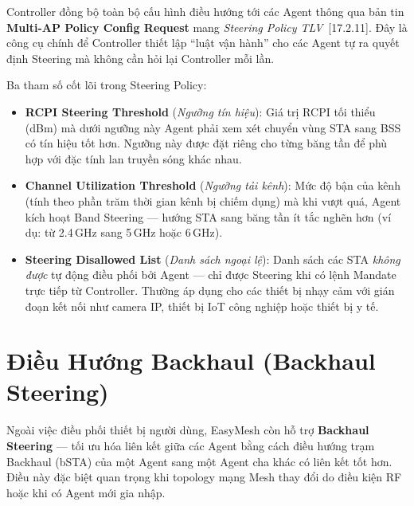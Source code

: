 Controller đồng bộ toàn bộ cấu hình điều hướng tới các Agent thông qua bản tin
\textbf{Multi-AP Policy Config Request} mang \textit{Steering Policy TLV}~[17.2.11].
Đây là công cụ chính để Controller thiết lập ``luật vận hành'' cho các Agent tự ra
quyết định Steering mà không cần hỏi lại Controller mỗi lần.

Ba tham số cốt lõi trong Steering Policy:
\begin{itemize}
	\item \textbf{RCPI Steering Threshold} (\textit{Ngưỡng tín hiệu}): Giá trị RCPI
	tối thiểu (dBm) mà dưới ngưỡng này Agent phải xem xét chuyển vùng STA sang
	BSS có tín hiệu tốt hơn. Ngưỡng này được đặt riêng cho từng băng tần để phù
	hợp với đặc tính lan truyền sóng khác nhau.
	\item \textbf{Channel Utilization Threshold} (\textit{Ngưỡng tải kênh}): Mức độ
	bận của kênh (tính theo phần trăm thời gian kênh bị chiếm dụng) mà khi vượt
	quá, Agent kích hoạt Band Steering --- hướng STA sang băng tần ít tắc nghẽn
	hơn (ví dụ: từ 2.4\,GHz sang 5\,GHz hoặc 6\,GHz).
	\item \textbf{Steering Disallowed List} (\textit{Danh sách ngoại lệ}): Danh sách
	các STA \textit{không được} tự động điều phối bởi Agent --- chỉ được Steering
	khi có lệnh Mandate trực tiếp từ Controller. Thường áp dụng cho các thiết bị
	nhạy cảm với gián đoạn kết nối như camera IP, thiết bị IoT công nghiệp hoặc
	thiết bị y tế.
\end{itemize}


\section{Điều Hướng Backhaul (Backhaul Steering)}

Ngoài việc điều phối thiết bị người dùng, EasyMesh còn hỗ trợ \textbf{Backhaul
	Steering} --- tối ưu hóa liên kết giữa các Agent bằng cách điều hướng trạm Backhaul
(bSTA) của một Agent sang một Agent cha khác có liên kết tốt hơn. Điều này đặc biệt
quan trọng khi topology mạng Mesh thay đổi do điều kiện RF hoặc khi có Agent mới
gia nhập.

